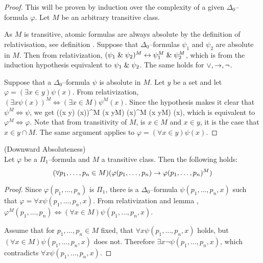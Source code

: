 \begin{proof}
This will be proven by induction over the complexity of a given $\Delta_0$–formula $\varphi$. Let $M$ be an arbitrary transitive class. 

As $M$ is transitive, atomic formulas are always absolute by the definition of relativisation, see definition .
Suppose that $\Delta_0$–formulas $\psi_1$ and $\psi_2$ are absolute in $M$. 
Then from relativization, $(\psi_1 \mathrel{\&} \psi_2)^M \leftrightarrow \psi_1^M \mathrel{\&} \psi_2^M$, which is from the induction hypothesis equivalent to $\psi_1 \mathrel{\&} \psi_2$. 
The same holds for $\lor, \rightarrow, \neg$.

Suppose that a $\Delta_0$–formula $\psi$ is absolute in $M$. Let $y$ be a set and let $\varphi = (\exists x \in y) \psi(x)$. 
From relativization, $(\exists x \psi(x))^M \iff (\exists x \in M) \psi^M(x)$. Since the hypothesis makes it clear that $\psi^M \iff \psi$, we get 
\beq
((\exists x \in y) \psi(x))^M \iff (\exists x \in y\cap M) \psi(x)^M \iff (\exists x \in y\cap M) \psi(x)\mbox{,}
\eeq
which is equivalent to $\varphi^M \iff \varphi$. Note that from transitivity of $M$, is $x \in M$ and $x \in y$, it is the case that $x \in y \cap M$. %
The same argument applies to $\varphi = (\forall x \in y) \psi(x)$.
\end{proof}

\begin{lemma}{(Downward Absoluteness)}\label{lemma:downward_absoluteness}\\
Let $\varphi$ be a $\Pi_1$–formula and $M$ a transitive class. Then the following holds:
\begin{equation}
(\forall p_1, \ldots, p_n \in M)(\varphi(p_1, \ldots, p_n) \rightarrow \varphi(p_1, \ldots, p_n)^M)
\end{equation}
\end{lemma}
\begin{proof}
Since $\varphi(p_1, \ldots, p_n)$ is $\Pi_1$, there is a $\Delta_0$–formula $\psi(p_1, \ldots, p_n, x)$ such that $\varphi = \forall x \psi(p_1, \ldots, p_n, x)$. 
From relativization and lemma , $\varphi^M(p_1, \ldots, p_n) \iff (\forall x \in M)\psi(p_1, \ldots, p_n, x)$.

Assume that for $p_1, \ldots, p_n \in M$ fixed, that $\forall x \psi(p_1, \ldots, p_n, x)$ holds, but $(\forall x \in M)\psi(p_1, \ldots, p_n, x)$ does not. 
Therefore $\exists x \neg \psi(p_1, \ldots, p_n, x)$, which contradicts $\forall x \psi(p_1, \ldots, p_n, x)$.
\end{proof}


